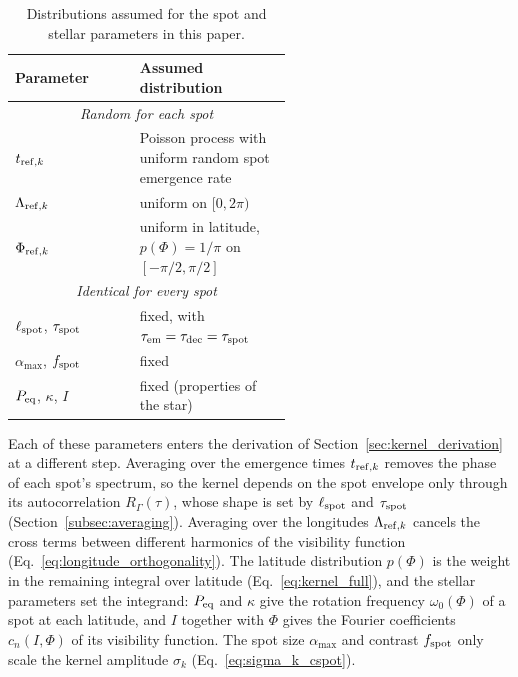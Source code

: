 \documentclass[preprint]{aastex702}
\begin{document}
\begin{table}[ht!]
    \centering
    \caption{Distributions assumed for the spot and stellar parameters in this paper.}
    \label{tab:assumed_distributions}
    \begin{tabular}{l >{\raggedright\arraybackslash}p{0.55\linewidth}}
        \hline
        Parameter & Assumed distribution \\
        \hline
        \multicolumn{2}{c}{\textit{Random for each spot}} \\
        $t_{{\rm ref},k}$ & Poisson process with uniform random spot emergence rate \\
        $\Lambda_{{\rm ref},k}$ & uniform on $[0, 2\pi)$ \\
        $\Phi_{{\rm ref},k}$ & uniform in latitude, $p(\Phi) = 1/\pi$ on $[-\pi/2, \pi/2]$ \\
        \hline
        \multicolumn{2}{c}{\textit{Identical for every spot}} \\
        $\ell_{\rm spot}$, $\tau_{\rm spot}$ & fixed, with $\tau_{\rm em} = \tau_{\rm dec} = \tau_{\rm spot}$ \\
        $\alpha_{\max}$, $f_{\rm spot}$ & fixed \\
        $P_{\rm eq}$, $\kappa$, $I$ & fixed (properties of the star) \\
        \hline
    \end{tabular}
\end{table}

Each of these parameters enters the derivation of Section~\ref{sec:kernel_derivation} at a different step. Averaging over the emergence times $t_{{\rm ref},k}$ removes the phase of each spot's spectrum, so the kernel depends on the spot envelope only through its autocorrelation $R_\Gamma(\tau)$, whose shape is set by $\ell_{\rm spot}$ and $\tau_{\rm spot}$ (Section~\ref{subsec:averaging}). Averaging over the longitudes $\Lambda_{{\rm ref},k}$ cancels the cross terms between different harmonics of the visibility function (Eq.~\ref{eq:longitude_orthogonality}). The latitude distribution $p(\Phi)$ is the weight in the remaining integral over latitude (Eq.~\ref{eq:kernel_full}), and the stellar parameters set the integrand: $P_{\rm eq}$ and $\kappa$ give the rotation frequency $\omega_0(\Phi)$ of a spot at each latitude, and $I$ together with $\Phi$ gives the Fourier coefficients $c_n(I, \Phi)$ of its visibility function. The spot size $\alpha_{\max}$ and contrast $f_{\rm spot}$ only scale the kernel amplitude $\sigma_k$ (Eq.~\ref{eq:sigma_k_cspot}).
\end{document}
